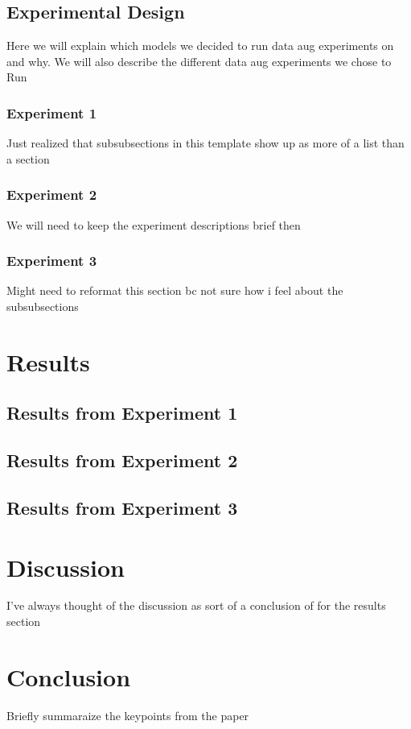 \documentclass[journal, final]{IEEEtran}
\begin{document}
        \subsection{Experimental Design}\label{ss:experiments}
            Here we will explain which models we decided to run
            data aug experiments on and why. We will also describe the
            different data aug experiments we chose to Run
            \subsubsection{Experiment 1}
                Just realized that subsubsections in this template show
                up as more of a list than a section
            \subsubsection{Experiment 2}
                We will need to keep the experiment descriptions brief then
            \subsubsection{Experiment 3}
                Might need to reformat this section bc not sure how i feel
                about the subsubsections
    \section{Results}\label{s:results}
        \subsection{Results from Experiment 1}
        \subsection{Results from Experiment 2}
        \subsection{Results from Experiment 3}

    \section{Discussion}
        I've always thought of the discussion as sort of a conclusion of
        for the results  section
    \section{Conclusion}
        Briefly summaraize the keypoints from the paper
\end{document}
